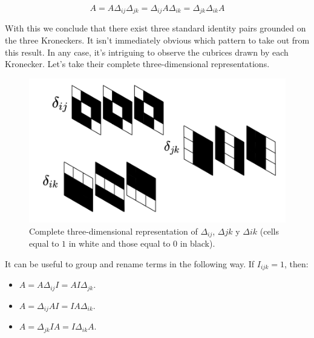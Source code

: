 $$A = A \Delta_{ij} \Delta_{jk} = \Delta_{ij} A \Delta_{ik} = \Delta_{jk} \Delta_{ik} A$$

\newpage

With this we conclude that there exist three standard identity pairs grounded on the three Kroneckers. It isn't immediately obvious which pattern to take out from this result. In any case, it's intriguing to observe the cubrices drawn by each Kronecker. Let's take their complete three-dimensional representations.

\begin{figure}[H]
	\includegraphics[width=\linewidth]{media/kroneckers.png}
	\caption{Complete three-dimensional representation of $\Delta_{ij}$, $\Delta{jk}$ y $\Delta{ik}$ (cells equal to $1$ in white and those equal to $0$ in black).}
\end{figure}

It can be useful to group and rename terms in the following way. If $I_{ijk} = 1$, then:

\begin{itemize}
	\item $A = A \Delta_{ij} I = A I \Delta_{jk}$.
	\item $A = \Delta_{ij} A I = I A \Delta_{ik}$.
	\item $A = \Delta_{jk} I A = I \Delta_{ik} A$.
\end{itemize}

\newpage
